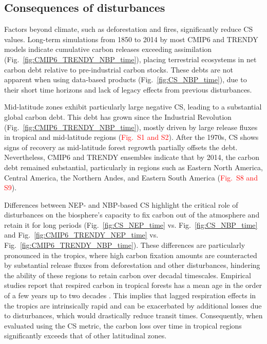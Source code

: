\documentclass[ProofPDF]{./Styles/Jnls-Template-V3}
\begin{document}
\subsection{Consequences of disturbances}
Factors beyond climate, such as deforestation and fires, significantly reduce CS values. Long-term simulations from 1850 to 2014 by most CMIP6 and TRENDY models indicate cumulative carbon releases exceeding assimilation (Fig.~\ref{fig:CMIP6_TRENDY_NBP_time}), placing terrestrial ecosystems in net carbon debt relative to pre-industrial carbon stocks. These debts are not apparent when using data-based products (Fig.~\ref{fig:CS_NBP_time}), due to their short time horizons and lack of legacy effects from previous disturbances. 

Mid-latitude zones exhibit particularly large negative CS, leading to a substantial global carbon debt. This debt has grown since the Industrial Revolution (Fig.~\ref{fig:CMIP6_TRENDY_NBP_time}), mostly driven by large release fluxes in tropical and mid-latitude regions (\textcolor{red}{Fig.~S1 and S2}). After the 1970s, CS shows signs of recovery as mid-latitude forest regrowth partially offsets the debt. 
Nevertheless, CMIP6 and TRENDY ensembles indicate that by 2014, the carbon debt remained substantial, particularly in regions such as Eastern North America, Central America, the Northern Andes, and Eastern South America (\textcolor{red}{Fig.~S8 and S9}).

Differences between NEP- and NBP-based CS highlight the critical role of disturbances on the biosphere's capacity to fix carbon out of the atmosphere and retain it for long periods (Fig.~\ref{fig:CS_NEP_time} vs. Fig.~\ref{fig:CS_NBP_time} and Fig.~\ref{fig:CMIP6_TRENDY_NEP_time} vs. Fig.~\ref{fig:CMIP6_TRENDY_NBP_time}). These differences are particularly pronounced in the tropics, where high carbon fixation amounts are counteracted by substantial release fluxes from deforestation and other disturbances, hindering the ability of these regions to retain carbon over decadal timescales. Empirical studies report that respired carbon in tropical forests has a mean age in the order of a few years up to two decades \citep{Sierra2021JE,Chanca2025}. This implies that lagged respiration effects in the tropics are intrinsically rapid and can be exacerbated by additional losses due to disturbances, which would drastically reduce transit times. Consequently, when evaluated using the CS metric, the carbon loss over time in tropical regions significantly exceeds that of other latitudinal zones. 
\end{document}
